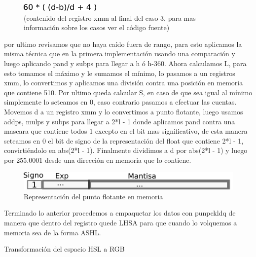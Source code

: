 \documentclass[a4paper]{article}
\begin{document}
\begin{figure}[H]
\centering
\includegraphics[scale=0.8]{imagenes/resultH.png}
\caption{(contenido del registro xmm al final del caso 3, para mas información sobre los casos ver el código fuente)}
\label{lshValue}
\end{figure}

 por ultimo revisamos que no haya caído fuera de rango, para esto aplicamos la misma técnica que en la primera implementación usando una comparación y luego aplicando pand y subps para llegar a h ó h-360.
 \newline
Ahora calculamos L, para esto tomamos el máximo y le sumamos el mínimo, lo pasamos a un registros xmm, lo convertimos y aplicamos una división contra una posición en memoria que contiene 510.
\newline
Por ultimo queda calcular S, en caso de que sea igual al mínimo simplemente lo seteamos en 0, caso contrario pasamos a efectuar las cuentas. Movemos d a un registro xmm y lo convertimos a punto flotante, luego usamos addps, mulps y subps para llegar a 2*l - 1 donde aplicamos pand contra una mascara que contiene todos 1 excepto en el bit mas significativo, de esta manera seteamos en 0 el bit de signo de la representación del float que contiene 2*l - 1, convirtiéndolo en abs(2*l - 1). Finalmente dividimos a d por abs(2*l - 1) y luego por 255.0001 desde una dirección en memoria que lo contiene.
\newline

\begin{figure}[H]
\centering
\includegraphics[scale=0.8]{imagenes/representacionfloat.png}
\caption{Representación del punto flotante en memoria}
\label{lshValue2}
\end{figure}

Terminado lo anterior procedemos a empaquetar los datos con punpckldq de manera que dentro del registro quede LHSA para que cuando lo volquemos a memoria sea de la forma ASHL.
\newline\newline

Transformación del espacio HSL a RGB
\newline\newline
\end{document}
